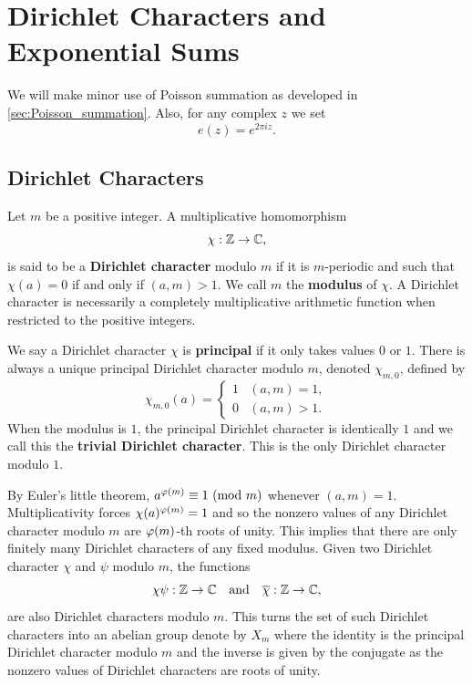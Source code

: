 \chapter{Dirichlet Characters and Exponential Sums}
  We will make minor use of Poisson summation as developed in \cref{sec:Poisson_summation}. Also, for any complex \(z\) we set
  \[
    e(z) = e^{2\pi iz}.
  \]
  \section{Dirichlet Characters}
    Let \(m\) be a positive integer. A multiplicative homomorphism
    \[
      \chi:\mathbb{Z} \to \mathbb{C},
    \]
    is said to be a \textbf{Dirichlet character} modulo \(m\) if it is \(m\)-periodic and such that \(\chi(a) = 0\) if and only if \((a,m) > 1\). We call \(m\) the \textbf{modulus} of \(\chi\). A Dirichlet character is necessarily a completely multiplicative arithmetic function when restricted to the positive integers.
    
    We say a Dirichlet character \(\chi\) is \textbf{principal} if it only takes values \(0\) or \(1\). There is always a unique principal Dirichlet character modulo \(m\), denoted \(\chi_{m,0}\), defined by
    \[
      \chi_{m,0}(a) = \begin{cases} 1 & (a,m) = 1, \\ 0 & (a,m) > 1. \end{cases}
    \]
    When the modulus is \(1\), the principal Dirichlet character is identically \(1\) and we call this the \textbf{trivial Dirichlet character}. This is the only Dirichlet character modulo \(1\).
    
    By Euler's little theorem, \(a^{\varphi(m)} \equiv 1 \ (\mathrm{mod}\text{ }m)\) whenever \((a,m) = 1\). Multiplicativity forces \(\chi(a)^{\varphi(m)} = 1\) and so the nonzero values of any Dirichlet character modulo \(m\) are \(\varphi(m)\)-th roots of unity. This implies that there are only finitely many Dirichlet characters of any fixed modulus. Given two Dirichlet character \(\chi\) and \(\psi\) modulo \(m\), the functions
    \[
      \chi\psi:\mathbb{Z} \to \mathbb{C} \quad \text{and} \quad \overline{\chi}:\mathbb{Z} \to \mathbb{C},
    \]
    are also Dirichlet characters modulo \(m\). This turns the set of such Dirichlet characters into an abelian group denote by \(X_{m}\) where the identity is the principal Dirichlet character modulo \(m\) and the inverse is given by the conjugate as the nonzero values of Dirichlet characters are roots of unity.
    

